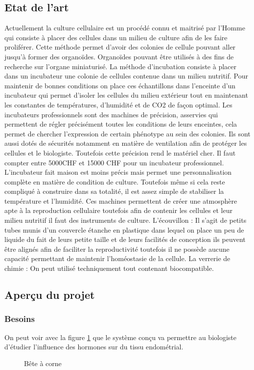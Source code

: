 \documentclass[a4paper, 11pt]{article}
\begin{document}
\subsection{Etat de l'art}
Actuellement la culture cellulaire est un procédé connu et maitrisé par l'Homme qui consiste à placer des cellules dans un milieu de culture afin de les faire proliférer.
Cette méthode permet d'avoir des colonies de cellule pouvant aller jusqu'à former des organoïdes.
Organoïdes pouvant être utilisés à des fins de recherche sur l'organe miniaturisé.
La méthode d'incubation consiste à placer dans un incubateur une colonie de cellules contenue dans un milieu nutritif.
Pour maintenir de bonnes conditions on place ces échantillons dans l'enceinte d'un incubateur qui permet d'isoler les cellules du milieu extérieur tout en maintenant les constantes de températures, d'humidité et de CO2 de façon optimal.
Les incubateurs professionnels sont des machines de précision, asservies qui permettent de régler précisément toutes les conditions de leurs enceintes, cela permet de chercher l'expression de certain phénotype au sein des colonies.
Ils sont aussi dotés de sécurités notamment en matière de ventilation afin de protéger les cellules et le biologiste. Toutefois cette précision rend le matériel cher.
Il faut compter entre 5000CHF et 15000 CHF pour un incubateur professionnel.
L'incubateur fait maison est moins précis mais permet une personnalisation complète en matière de condition de culture.
Toutefois même si cela reste compliqué à construire dans sa totalité, il est assez simple de stabiliser la température et l'humidité.
Ces machines permettent de créer une atmosphère apte à la reproduction cellulaire toutefois afin de contenir les cellules et leur milieu nutritif il faut des instruments de culture.
L'écouvillon : Il s'agit de petits tubes munis d'un couvercle étanche en plastique dans lequel on place un peu de liquide du fait de leurs petite taille et de leurs facilités de conception ils peuvent être alignés afin de faciliter la reproductivité toutefois il ne possède aucune capacité permettant de maintenir l'homéostasie de la cellule.
La verrerie de chimie : On peut utilisé techniquement tout contenant biocompatible.
\newpage
\subsection{Aperçu du projet}
\subsubsection{Besoins}
On peut voir avec la figure \ref{fig:bete_corne} que le système conçu va permettre au biologiste d'étudier l'influence des hormones sur du tissu endométrial.
\begin{figure}[H]
    \centering
    \caption{Bête à corne}
    \label{fig:bete_corne}
\end{figure}
\end{document}
